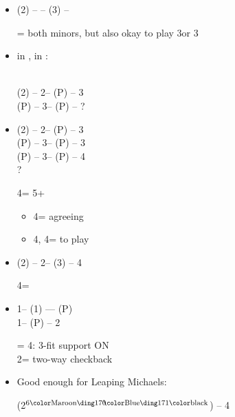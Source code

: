 \documentclass[12pt, a4paper]{article}
\begin{document}
\begin{itemize}
\item (2\spades) -- \dbl -- (3\spades) -- \dbl

\dbl = both minors, but also okay to play 3\spades\dbl or 3\nt

\item \gf in , \soff in :

 \\
(2\spades) -- 2\nt -- (P) -- 3\diams \\
(P) -- 3\hearts -- (P) -- ?

\item
(2\spades) -- 2\nt -- (P) -- 3\clubs \\
(P) -- 3\diams -- (P) -- 3\spades \\
(P) -- 3\nt -- (P) -- 4\clubs \\
?

4\clubs = 5+\clubs
\begin{itemize}
    \item 4\diams = agreeing \clubs
    \item 4\hearts, 4\nt = to play
\end{itemize}

\item 
(2\hearts) -- 2\nt -- (3\hearts) -- 4\hearts 

4\hearts = \trsf{\spades}

\item 
1\clubs -- (1\spades) --\dbl -- (P) \\
1\nt -- (P) -- 2\diams

\dbl = 4\hearts: 3-fit support ON\\
2\diams = two-way checkback

\item Good enough for Leaping Michaels:\\

(2\diams$^\text{6\major}$) -- 4\clubs




\end{itemize}
\end{document}
